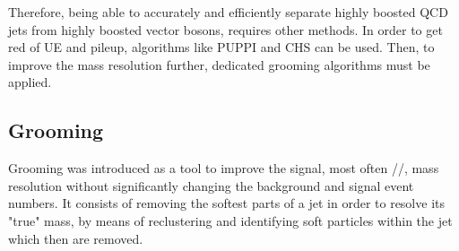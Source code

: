 Therefore, being able to accurately and efficiently separate highly boosted QCD jets from highly boosted vector bosons, requires other methods.
In order to get red of UE and pileup, algorithms like PUPPI and CHS can be used. Then, to improve the mass resolution further, dedicated grooming algorithms must be applied.

\subsection{Grooming}
\label{sec:objreco:grooming}
Grooming was introduced as a tool to improve the signal, most often \PW/\PZ/, mass resolution without significantly changing the background and signal event numbers. It consists of removing the softest parts of a jet in order to resolve its "true" mass, by means of reclustering and identifying soft particles within the jet which then are removed.

